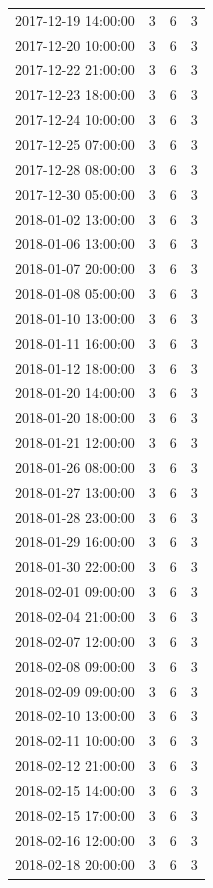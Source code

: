 \begin{tabular}{lrrr}
2017-12-19 14:00:00 & 3 & 6 & 3 \\
2017-12-20 10:00:00 & 3 & 6 & 3 \\
2017-12-22 21:00:00 & 3 & 6 & 3 \\
2017-12-23 18:00:00 & 3 & 6 & 3 \\
2017-12-24 10:00:00 & 3 & 6 & 3 \\
2017-12-25 07:00:00 & 3 & 6 & 3 \\
2017-12-28 08:00:00 & 3 & 6 & 3 \\
2017-12-30 05:00:00 & 3 & 6 & 3 \\
2018-01-02 13:00:00 & 3 & 6 & 3 \\
2018-01-06 13:00:00 & 3 & 6 & 3 \\
2018-01-07 20:00:00 & 3 & 6 & 3 \\
2018-01-08 05:00:00 & 3 & 6 & 3 \\
2018-01-10 13:00:00 & 3 & 6 & 3 \\
2018-01-11 16:00:00 & 3 & 6 & 3 \\
2018-01-12 18:00:00 & 3 & 6 & 3 \\
2018-01-20 14:00:00 & 3 & 6 & 3 \\
2018-01-20 18:00:00 & 3 & 6 & 3 \\
2018-01-21 12:00:00 & 3 & 6 & 3 \\
2018-01-26 08:00:00 & 3 & 6 & 3 \\
2018-01-27 13:00:00 & 3 & 6 & 3 \\
2018-01-28 23:00:00 & 3 & 6 & 3 \\
2018-01-29 16:00:00 & 3 & 6 & 3 \\
2018-01-30 22:00:00 & 3 & 6 & 3 \\
2018-02-01 09:00:00 & 3 & 6 & 3 \\
2018-02-04 21:00:00 & 3 & 6 & 3 \\
2018-02-07 12:00:00 & 3 & 6 & 3 \\
2018-02-08 09:00:00 & 3 & 6 & 3 \\
2018-02-09 09:00:00 & 3 & 6 & 3 \\
2018-02-10 13:00:00 & 3 & 6 & 3 \\
2018-02-11 10:00:00 & 3 & 6 & 3 \\
2018-02-12 21:00:00 & 3 & 6 & 3 \\
2018-02-15 14:00:00 & 3 & 6 & 3 \\
2018-02-15 17:00:00 & 3 & 6 & 3 \\
2018-02-16 12:00:00 & 3 & 6 & 3 \\
2018-02-18 20:00:00 & 3 & 6 & 3 \\

\end{tabular}
